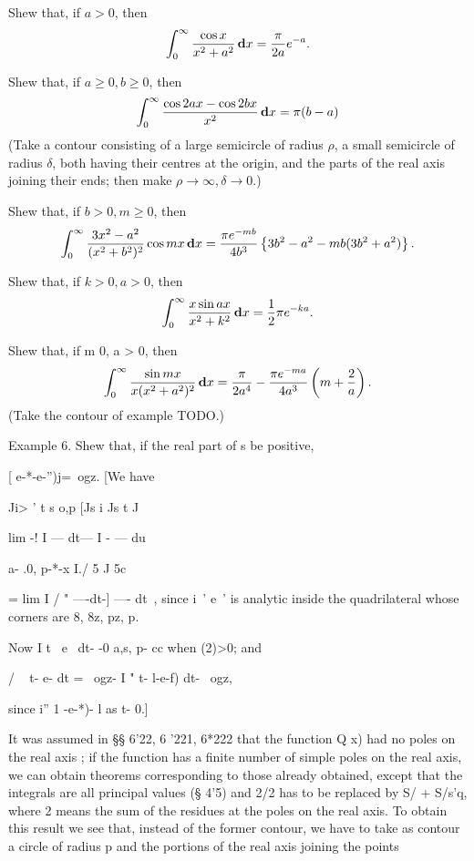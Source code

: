 \begin{wandwexample}
  Shew that, if $a > 0$, then
  $$
  \int_{0}^{\infty}
  \frac{ \cos x}{x^{2} + a^{2}} \, \mathbf{d} x
  =
  \frac{\pi}{2a} e^{-a}.
  $$
\end{wandwexample}
\begin{wandwexample}
  Shew that, if $a \geq 0, b \geq 0$, then
  $$
  \int_{0}^{\infty}
  \frac{ \cos 2ax - \cos 2bx}{x^{2}}
  \, \mathbf{d} x
  =
  \pi (b-a)
  $$
  (Take a contour consisting of a large semicircle of radius $\rho$, a
  small semicircle of radius $\delta$, both having their centres at the
  origin, and the parts of the real axis joining their ends; then
  make $\rho \rightarrow \infty, \delta \rightarrow 0$.)
\end{wandwexample}
\begin{wandwexample}
  Shew that, if $b > 0, m \geq 0$, then
  $$
  \int_{0}^{\infty}
  \frac{3x^{2} - a^{2}}{ (x^{2} + b^{2})^{2} }
  \cos mx
  \, \mathbf{d} x
  =
  \frac{\pi e^{-mb}}{4b^{3}}
  \left\{ 
    3b^{2} - a^{2} - mb(3b^{2}+a^{2})
   \right\}.
  $$
\end{wandwexample}
\begin{wandwexample}
  Shew that, if $k > 0, a > 0$, then
  $$
  \int_{0}^{\infty}
  \frac{ x \sin ax }{x^{2} + k^{2}}
  \, \mathbf{d} x
  =
  \frac{1}{2} \pi e^{-ka}.
  $$
\end{wandwexample}
\begin{wandwexample}
  Shew that, if m 0, a > 0, then
  $$
  \int_{0}^{\infty}
  \frac{ \sin mx }{ x (x^{2} + a^{2})^{2} }
  \, \mathbf{d} x
  =
  \frac{\pi}{2a^{4}}
  -
  \frac{\pi e^{-ma}}{4a^{3}}
  \left(  m + \frac{2}{a}  \right).
  $$
  (Take the contour of example TODO.)
\end{wandwexample}
\begin{wandwexample}
Example 6. Shew that, if the real part of s be positive,

[ e-*-e-'')j=\ ogz. [We have

Ji> ' t s o,p [Js i Js t J

lim -! I — dt— I - — du

a- .0, p-*-x I./ 5 J 5c

= lim I / " —-dt-] —- dt\ , since i~' e~' is analytic inside the
quadrilateral whose corners are 8, 8z, pz, p.

%
%

Now I t~ e~ dt- -0 a,s, p- cc when (2)>0; and

/ ~ t- e- dt = \ ogz- I " t- l-e-f) dt- \ ogz,

since i'' 1 -e-*)- l as t- 0.]
\end{wandwexample}
It was assumed in §§ 6'22, 6 '221, 6*222 that the function Q x) had no
poles on the real axis ; if the function has a finite number of simple
poles on the real axis, we can obtain theorems corresponding to those
already obtained, except that the integrals are all principal values
(§ 4'5) and 2/2 has to be replaced by S/ + S/s'q, where 2 means the
sum of the residues at the poles on the real axis. To obtain this
result we see that, instead of the former contour, we have to take as
contour a circle of radius p and the portions of the real axis joining
the points

